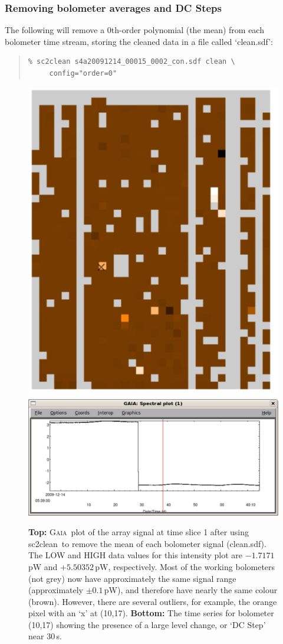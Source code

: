 \documentclass[twoside,11pt]{article}
\newcommand{\xref}[3]{#1}
\newcommand{\xlabel}[1]{}
\renewcommand{\_}{\texttt{\symbol{95}}}
\newenvironment{myquote}{\begin{quote}\begin{small}}{\end{small}\end{quote}}
\newcommand{\gaia}{\xref{\textsc{Gaia}}{sun214}{}}
\newcommand{\task}[1]{\textsf{#1}}
\newcommand{\clean}{\xref{\task{sc2clean}}{sun258}{SC2CLEAN}}
\begin{document}
\subsubsection{\xlabel{clean_average}Removing bolometer averages and DC Steps}

The following will remove a 0th-order polynomial (the mean) from each
bolometer time stream, storing the cleaned data in a file called
`clean.sdf':

\begin{myquote}
\begin{verbatim}
% sc2clean s4a20091214_00015_0002_con.sdf clean \
     config="order=0"
\end{verbatim}
\end{myquote}

\begin{figure}
\begin{center}
\includegraphics[width=0.5\linewidth]{sc19_array_mean}
\includegraphics[width=0.9\linewidth]{sc19_dcstep}
\caption{{\bf Top:} \gaia\ plot of the array signal at time slice 1
  after using \clean\ to remove the mean of each bolometer signal
  (clean.sdf). The LOW and HIGH data values for this intensity plot
  are $-1.7171$\,pW and $+5.50352$\,pW, respectively. Most of the
  working bolometers (not grey) now have approximately the same signal
  range (approximately $\pm 0.1$\,pW), and therefore have nearly the
  same colour (brown). However, there are several outliers, for
  example, the orange pixel with an `x' at (10,17). {\bf Bottom:} The
  time series for bolometer (10,17) showing the presence of a large
  level change, or `DC Step' near 30\,s.}
\label{fig:array_mean}
\end{center}
\end{figure}
\end{document}
